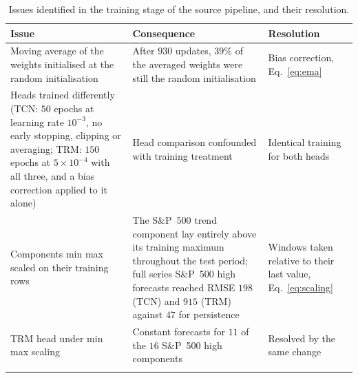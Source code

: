 \documentclass[pdflatex,sn-mathphys-num]{sn-jnl}%
\theoremstyle{thmstyleone}%
\theoremstyle{thmstyletwo}%
\theoremstyle{thmstylethree}%
\begin{document}
\begin{table}[ht]
\caption{Issues identified in the training stage of the source pipeline, and their resolution.}
\label{tab:audit_train}
\small
\begin{tabular}{@{}L{0.30\textwidth}L{0.39\textwidth}L{0.23\textwidth}@{}}
\toprule
Issue & Consequence & Resolution \\
\midrule
Moving average of the weights initialised at the random initialisation &
After $930$ updates, $39\%$ of the averaged weights were still the random initialisation &
Bias correction, Eq.~\eqref{eq:ema} \\
Heads trained differently (TCN: $50$ epochs at learning rate $10^{-3}$, no early stopping, clipping or averaging; TRM: $150$ epochs at $5\times10^{-4}$ with all three, and a bias correction applied to it alone) &
Head comparison confounded with training treatment &
Identical training for both heads \\
Components min max scaled on their training rows &
The S\&P~500 trend component lay entirely above its training maximum throughout the test period; full series S\&P~500 high forecasts reached RMSE $198$ (TCN) and $915$ (TRM) against $47$ for persistence &
Windows taken relative to their last value, Eq.~\eqref{eq:scaling} \\
TRM head under min max scaling &
Constant forecasts for $11$ of the $16$ S\&P~500 high components &
Resolved by the same change \\
\botrule
\end{tabular}
\end{table}
\end{document}
